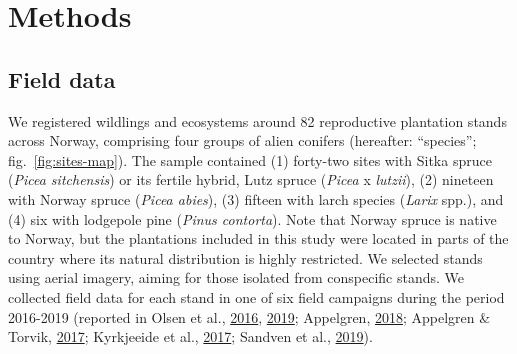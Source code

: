 \documentclass[
]{article}
\begin{document}
\hypertarget{methods}{%
\section{Methods}\label{methods}}

\hypertarget{field-data}{%
\subsection{Field data}\label{field-data}}

We registered wildlings and ecosystems around 82 reproductive plantation stands across Norway, comprising four groups of alien conifers (hereafter: ``species''; fig.~\ref{fig:sites-map}).
The sample contained (1) forty-two sites with Sitka spruce (\emph{Picea sitchensis}) or its fertile hybrid, Lutz spruce (\emph{Picea} x \emph{lutzii}), (2) nineteen with Norway spruce (\emph{Picea abies}), (3) fifteen with larch species (\emph{Larix} spp.), and (4) six with lodgepole pine (\emph{Pinus contorta}).
Note that Norway spruce is native to Norway, but the plantations included in this study were located in parts of the country where its natural distribution is highly restricted.
We selected stands using aerial imagery, aiming for those isolated from conspecific stands.
We collected field data for each stand in one of six field campaigns during the period 2016-2019 (reported in Olsen et al., \protect\hyperlink{ref-olsenKartleggingAvKortdistansespredning2016}{2016}, \protect\hyperlink{ref-olsenKartleggingAvKortdistansespredning2019}{2019}; Appelgren, \protect\hyperlink{ref-appelgrenKartleggingAvKortdistansespredning2018}{2018}; Appelgren \& Torvik, \protect\hyperlink{ref-appelgrenKartleggingAvKortdistansespredning2017}{2017}; Kyrkjeeide et al., \protect\hyperlink{ref-kyrkjeeideKartleggingAvKortdistansespredning2017}{2017}; Sandven et al., \protect\hyperlink{ref-sandvenKartleggingAvKortdistansespredning2019}{2019}).
\end{document}
